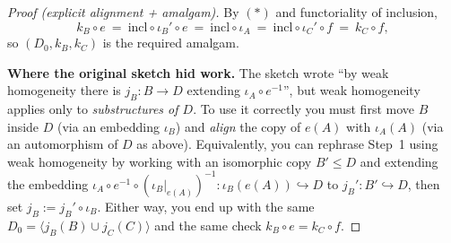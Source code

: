 \begin{mynote}
\begin{proof}[Proof (explicit alignment + amalgam)]
        By $(\ast)$ and functoriality of inclusion,
        \[
            k_B\circ e \ =\ \mathrm{incl}\circ \iota_B'\circ e
            \ =\ \mathrm{incl}\circ \iota_A
            \ =\ \mathrm{incl}\circ \iota_C'\circ f
            \ =\ k_C\circ f,
        \]
        so $(D_0,k_B,k_C)$ is the required amalgam.

        \smallskip
        \textbf{Where the original sketch hid work.}
        The sketch wrote “by weak homogeneity there is $j_B\colon B\to D$ extending
        $\iota_A\circ e^{-1}$”, but weak homogeneity applies only to \emph{substructures of $D$}.
        To use it correctly you must first move $B$ inside $D$ (via an embedding $\iota_B$) and
        \emph{align} the copy of $e(A)$ with $\iota_A(A)$ (via an automorphism of $D$ as above).
        Equivalently, you can rephrase Step~1 using weak homogeneity by working with an
        isomorphic copy $B'\le D$ and extending the embedding
        $\iota_A\circ e^{-1}\circ (\iota_B|_{e(A)})^{-1}\colon \iota_B(e(A))\hookrightarrow D$
        to $j_B'\colon B'\hookrightarrow D$, then set $j_B:=j_B'\circ \iota_B$.
        Either way, you end up with the same $D_0=\langle j_B(B)\cup j_C(C)\rangle$ and the same check
        $k_B\circ e=k_C\circ f$.
    \end{proof}



\end{mynote}